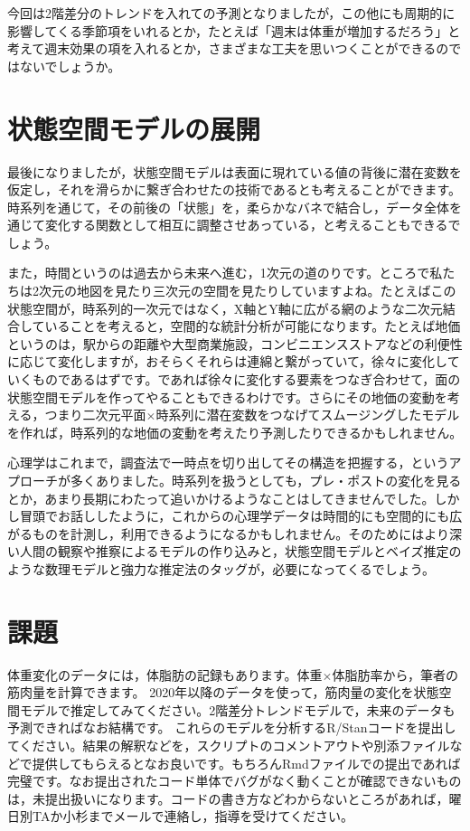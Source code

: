 \documentclass{ltjsbook}
\begin{document}
今回は2階差分のトレンドを入れての予測となりましたが，この他にも周期的に影響してくる季節項をいれるとか，たとえば「週末は体重が増加するだろう」と考えて週末効果の項を入れるとか，さまざまな工夫を思いつくことができるのではないでしょうか。

\section{状態空間モデルの展開}
最後になりましたが，状態空間モデルは表面に現れている値の背後に潜在変数を仮定し，それを滑らかに繋ぎ合わせたの技術であるとも考えることができます。時系列を通じて，その前後の「状態」を，柔らかなバネで結合し，データ全体を通じて変化する関数として相互に調整させあっている，と考えることもできるでしょう。

また，時間というのは過去から未来へ進む，1次元の道のりです。ところで私たちは2次元の地図を見たり三次元の空間を見たりしていますよね。たとえばこの状態空間が，時系列的一次元ではなく，X軸とY軸に広がる網のような二次元結合していることを考えると，空間的な統計分析が可能になります。たとえば地価というのは，駅からの距離や大型商業施設，コンビニエンスストアなどの利便性に応じて変化しますが，おそらくそれらは連綿と繋がっていて，徐々に変化していくものであるはずです。であれば徐々に変化する要素をつなぎ合わせて，面の状態空間モデルを作ってやることもできるわけです。さらにその地価の変動を考える，つまり二次元平面$\times$時系列に潜在変数をつなげてスムージングしたモデルを作れば，時系列的な地価の変動を考えたり予測したりできるかもしれません。

心理学はこれまで，調査法で一時点を切り出してその構造を把握する，というアプローチが多くありました。時系列を扱うとしても，プレ・ポストの変化を見るとか，あまり長期にわたって追いかけるようなことはしてきませんでした。しかし冒頭でお話ししたように，これからの心理学データは時間的にも空間的にも広がるものを計測し，利用できるようになるかもしれません。そのためにはより深い人間の観察や推察によるモデルの作り込みと，状態空間モデルとベイズ推定のような数理モデルと強力な推定法のタッグが，必要になってくるでしょう。

\section{課題}
体重変化のデータには，体脂肪の記録もあります。体重$\times$体脂肪率から，筆者の筋肉量を計算できます。
2020年以降のデータを使って，筋肉量の変化を状態空間モデルで推定してみてください。2階差分トレンドモデルで，未来のデータも予測できればなお結構です。
これらのモデルを分析するR/Stanコードを提出してください。結果の解釈などを，スクリプトのコメントアウトや別添ファイルなどで提供してもらえるとなお良いです。もちろんRmdファイルでの提出であれば完璧です。なお提出されたコード単体でバグがなく動くことが確認できないものは，未提出扱いになります。コードの書き方などわからないところがあれば，曜日別TAか小杉までメールで連絡し，指導を受けてください。
\end{document}
